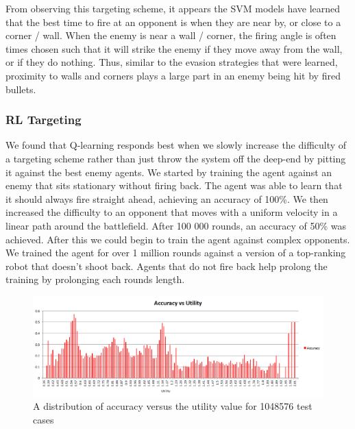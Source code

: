 \documentclass{article}
\theoremstyle{plain}
\theoremstyle{definition}
\theoremstyle{remark}
\begin{document}
From observing this targeting scheme, it appears the SVM models have learned that the best time to fire at an opponent is when they are near by, or close to a corner / wall. When the enemy is near a wall / corner, the firing angle is often times chosen such that it will strike the enemy if they move away from the wall, or if they do nothing. Thus, similar to the evasion strategies that were learned, proximity to walls and corners plays a large part in an enemy being hit by fired bullets. 

\subsubsection*{RL Targeting}
We found that Q-learning responds best when we slowly increase the difficulty of a targeting scheme rather than just throw the system off the deep-end by pitting it against the best enemy agents. We started by training the agent against an enemy that sits stationary without firing back. The agent was able to learn that it should always fire straight ahead, achieving an accuracy of 100\%. We then increased the difficulty to an opponent that moves with a uniform velocity in a linear path around the battlefield. After 100 000 rounds, an accuracy of 50\% was achieved. After this we could begin to train the agent against complex opponents. We trained the agent for over 1 million rounds against a version of a top-ranking robot that doesn't shoot back. Agents that do not fire back help prolong the training by prolonging each rounds length.
\begin{figure}[h]
	\centering
		\includegraphics[width=15 cm]{Q_accu.png}
	\caption{A distribution of accuracy versus the utility value for 1048576 test cases}
	\label{q_accu}
\end{figure}
\end{document}
